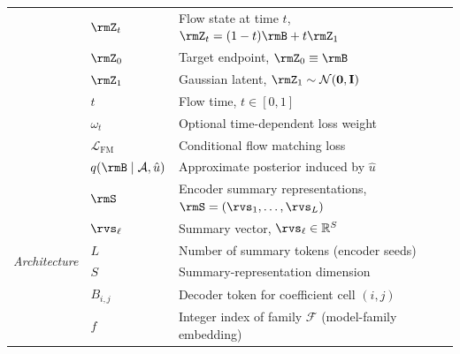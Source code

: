\begin{table}[h]
\begin{tabularx}{\linewidth}{@{}p{2.4cm} l >{\raggedright\arraybackslash}X@{}}
 & $\rmZ_t$ & Flow state at time $t$, $\rmZ_t=(1-t)\rmB+t\rmZ_1$ \\
 & $\rmZ_0$ & Target endpoint, $\rmZ_0 \equiv \rmB$ \\
 & $\rmZ_1$ & Gaussian latent, $\rmZ_1\sim\mathcal{N}(\mathbf{0},\mathbf{I})$ \\
 & $t$ & Flow time, $t\in[0,1]$ \\
 & $\omega_t$ & Optional time-dependent loss weight \\
 & $\mathcal{L}_{\mathrm{FM}}$ & Conditional flow matching loss \\
 & $q(\rmB\mid\mathcal{A},\hat{u})$ & Approximate posterior induced by $\hat{u}$ \\
\midrule
\multirow{6}{=}{\textit{Architecture}}
 & $\rmS$ & Encoder summary representations, $\rmS=(\rvs_1,\dots,\rvs_L)$ \\
 & $\rvs_{\ell}$ & Summary vector, $\rvs_{\ell}\in\mathbb{R}^{S}$ \\
 & $L$ & Number of summary tokens (encoder seeds) \\
 & $S$ & Summary-representation dimension \\
 & $B_{i,j}$ & Decoder token for coefficient cell $(i,j)$ \\
 & $f$ & Integer index of family $\mathcal{F}$ (model-family embedding) \\
\bottomrule
\end{tabularx}
\label{tab:notation}
\end{table}